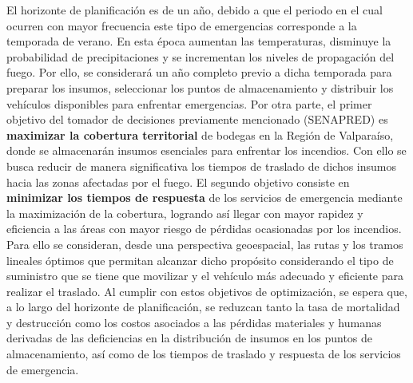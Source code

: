 \documentclass[letterpaper]{article}
\begin{document}
\begin{flushleft}
El horizonte de planificaci\'on es de un a\~no, debido a que el periodo en el cual ocurren con mayor frecuencia este tipo de emergencias corresponde a la temporada de verano. En esta \'epoca aumentan las temperaturas, disminuye la probabilidad de precipitaciones y se incrementan los niveles de propagaci\'on del fuego. Por ello, se considerar\'a un a\~no completo previo a dicha temporada para preparar los insumos, seleccionar los puntos de almacenamiento y distribuir los veh\'iculos disponibles para enfrentar emergencias. Por otra parte, el primer objetivo del tomador de decisiones previamente mencionado (SENAPRED) es \textbf{maximizar la cobertura territorial} de bodegas en la Regi\'on de Valpara\'iso, donde se almacenar\'an insumos esenciales para enfrentar los incendios. Con ello se busca reducir de manera significativa los tiempos de traslado de dichos insumos hacia las zonas afectadas por el fuego. El segundo objetivo consiste en \textbf{minimizar los tiempos de respuesta} de los servicios de emergencia mediante la maximizaci\'on de la cobertura, logrando as\'i llegar con mayor rapidez y eficiencia a las \'areas con mayor riesgo de p\'erdidas ocasionadas por los incendios. Para ello se consideran, desde una perspectiva geoespacial, las rutas y los tramos lineales \'optimos que permitan alcanzar dicho prop\'osito considerando el tipo de suministro que se tiene que movilizar y el veh\'iculo m\'as adecuado y eficiente para realizar el traslado. Al cumplir con estos objetivos de optimizaci\'on, se espera que, a lo largo del horizonte de planificaci\'on, se reduzcan tanto la tasa de mortalidad y destrucci\'on como los costos asociados a las p\'erdidas materiales y humanas derivadas de las deficiencias en la distribuci\'on de insumos en los puntos de almacenamiento, as\'i como de los tiempos de traslado y respuesta de los servicios de emergencia.\\


\end{flushleft}
\end{document}
